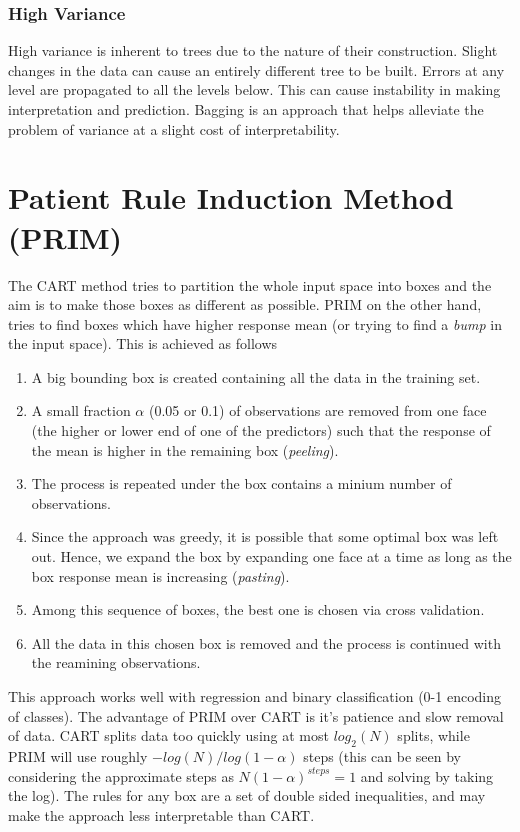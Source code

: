 \documentclass[../statistical_learning_notes.tex]{subfiles}
\begin{document}
    \subsubsection*{High Variance}
    High variance is inherent to trees due to the nature of their construction. Slight changes in the data can cause an entirely different tree to be built. Errors at any level are propagated to all the levels below. This can cause instability in making interpretation and prediction. Bagging is an approach that helps alleviate the problem of variance at a slight cost of interpretability.


    \section{Patient Rule Induction Method (PRIM)}
    The CART method tries to partition the whole input space into boxes and the aim is to make those boxes as different as possible. PRIM on the other hand, tries to find boxes which have higher response mean (or trying to find a \emph{bump} in the input space). This is achieved as follows

    \begin{enumerate}
        \item A big bounding box is created containing all the data in the training set.
        \item A small fraction $\alpha$ (0.05 or 0.1) of observations are removed from one face (the higher or lower end of one of the predictors) such that the response of the mean is higher in the remaining box (\emph{peeling}).
        \item The process is repeated under the box contains a minium number of observations.
        \item Since the approach was greedy, it is possible that some optimal box was left out. Hence, we expand the box by expanding one face at a time as long as the box response mean is increasing (\emph{pasting}).
        \item Among this sequence of boxes, the best one is chosen via cross validation.
        \item All the data in this chosen box is removed and the process is continued with the reamining observations.
    \end{enumerate}

    This approach works well with regression and binary classification (0-1 encoding of classes). The advantage of PRIM over CART is it's patience and slow removal of data. CART splits data too quickly using at most $log_{2}(N)$ splits, while PRIM will use roughly $-log(N)/log(1-\alpha)$ steps (this can be seen by considering the approximate steps as $N(1-\alpha)^{steps} = 1$ and solving by taking the log). The rules for any box are a set of double sided inequalities, and may make the approach less interpretable than CART. 
\end{document}
